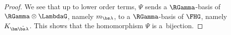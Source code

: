 \begin{proof}
We see that up to lower order terms, $\Psi$ sends a $\RGamma$-basis of $\RGamma \otimes \LambdaG$, namely $m_{\bs\lambda}$, to a $\RGamma$-basis of $\FHG$, namely $K_{\bm\hat{\bs\lambda}}$. This shows that the homomorphism $\Psi$ is a~bijection.
\end{proof}
